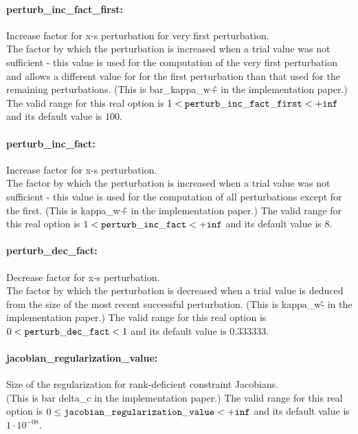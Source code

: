 \paragraph{perturb\_inc\_fact\_first:}\label{opt:perturb_inc_fact_first} Increase factor for x-s perturbation for very first perturbation. \\
 The factor by which the perturbation is increased
when a trial value was not sufficient - this
value is used for the computation of the very
first perturbation and allows a different value
for for the first perturbation than that used for
the remaining perturbations. (This is
bar\_kappa\_w\^+ in the implementation paper.) The valid range for this real option is 
$1 <  {\tt perturb\_inc\_fact\_first } <  {\tt +inf}$
and its default value is $100$.


\paragraph{perturb\_inc\_fact:}\label{opt:perturb_inc_fact} Increase factor for x-s perturbation. \\
 The factor by which the perturbation is increased
when a trial value was not sufficient - this
value is used for the computation of all
perturbations except for the first. (This is
kappa\_w\^+ in the implementation paper.) The valid range for this real option is 
$1 <  {\tt perturb\_inc\_fact } <  {\tt +inf}$
and its default value is $8$.


\paragraph{perturb\_dec\_fact:}\label{opt:perturb_dec_fact} Decrease factor for x-s perturbation. \\
 The factor by which the perturbation is decreased
when a trial value is deduced from the size of
the most recent successful perturbation. (This is
kappa\_w\^- in the implementation paper.) The valid range for this real option is 
$0 <  {\tt perturb\_dec\_fact } <  1$
and its default value is $0.333333$.


\paragraph{jacobian\_regularization\_value:}\label{opt:jacobian_regularization_value} Size of the regularization for rank-deficient constraint Jacobians. \\
 (This is bar delta\_c in the implementation
paper.) The valid range for this real option is 
$0 \le {\tt jacobian\_regularization\_value } <  {\tt +inf}$
and its default value is $1 \cdot 10^{-08}$.


